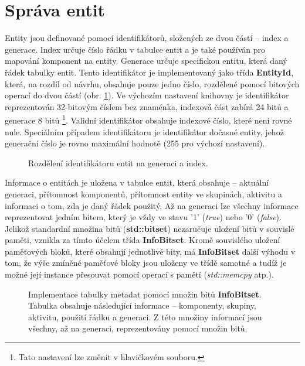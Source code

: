 \section{Správa entit}

Entity jsou definované pomocí identifikátorů, složených ze dvou částí -- index a generace. Index určuje číslo řádku v tabulce entit a je také používán pro mapování komponent na entity. Generace určuje specifickou entitu, která  daný řádek tabulky entit. Tento identifikátor je implementovaný jako třída \textbf{EntityId}, která, na rozdíl od návrhu, obsahuje pouze jedno číslo, rozdělené pomocí bitových operací do dvou částí (obr. \ref{Fig:IMPLIdent}). Ve výchozím nastavení knihovny je identifikátor reprezentován 32-bitovým číslem bez znaménka, indexová část zabírá 24 bitů a generace 8 bitů \footnote{Tato nastavení lze změnit v hlavičkovém souboru.}. Validní identifikátor obsahuje indexové číslo, které není rovné nule. Speciálním případem identifikátoru je identifikátor dočasné entity, jehož generační číslo je rovno maximální hodnotě (255 pro výchozí nastavení).

\begin{figure}[H]
	\begin{center}
	\end{center}
	\caption{Rozdělení identifikátoru entit na generaci a index.}
	\label{Fig:IMPLIdent}
\end{figure}

Informace o entitách je uložena v tabulce entit, která obsahuje -- aktuální generaci, přítomnost komponentů, přítomnost entity ve skupinách, aktivitu a informaci o tom, zda je daný řádek použitý. Až na generaci lze všechny informace reprezentovat jedním bitem, který je vždy ve stavu '1' (\emph{true}) nebo '0' (\emph{false}). Jelikož standardní množina bitů (\textbf{std::bitset}) nezaručuje uložení bitů v souvislé paměti, vznikla za tímto účelem třída \textbf{InfoBitset}. Kromě souvislého uložení paměťových bloků, které obsahují jednotlivé bity, má \textbf{InfoBitset} další výhodu v tom, že výše zmíněné paměťové bloky jsou uloženy ve třídě samotné a tudíž je možné její instance přesouvat pomocí operací s pamětí (\emph{std::memcpy} atp.).

\begin{figure}[H]
	\begin{center}
	\end{center}
	\caption{Implementace tabulky metadat pomocí množin bitů \textbf{InfoBitset}. Tabulka obsahuje následující informace -- komponenty, skupiny, aktivitu, použití řádku a generaci. Z této množiny informací jsou všechny, až na generaci, reprezentovány pomocí množin bitů.}
	\label{Fig:IMPLMetadata}
\end{figure}


